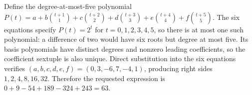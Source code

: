 Define the degree-at-most-five polynomial $P(t)=a+b\binom{t+1}{1}+c\binom{t+2}{2}+d\binom{t+3}{3}+e\binom{t+4}{4}+f\binom{t+5}{5}$. The six equations specify $P(t)=2^t$ for $t=0,1,2,3,4,5$, so there is at most one such polynomial: a difference of two would have six roots but degree at most five. Its basis polynomials have distinct degrees and nonzero leading coefficients, so the coefficient sextuple is also unique. Direct substitution into the six equations verifies $(a,b,c,d,e,f)=(0,3,-6,7,-4,1)$, producing right sides $1,2,4,8,16,32$. Therefore the requested expression is $0+9-54+189-324+243=\boxed{63}$.
